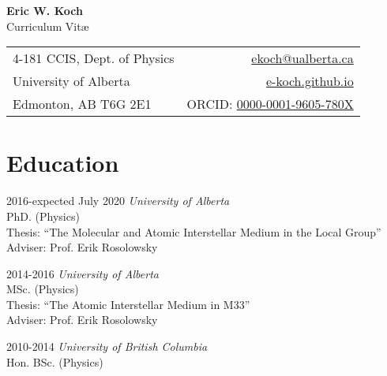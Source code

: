 \documentclass[letterpaper,11pt]{article}
\makeatletter
\newcommand{\myname}{Eric W. Koch}
\newcommand{\myaffil}{4-181 CCIS, Dept. of Physics}
\newcommand{\myemail}{ekoch@ualberta.ca}
\newcommand{\mypostlineone}{University of Alberta}
\newcommand{\mypostlinetwo}{Edmonton, AB T6G 2E1}
\newcommand{\mysite}{e-koch.github.io}
\newcommand{\myorcid}{https://orcid.org/0000-0001-9605-780X}
\newlength{\mainindent} \setlength{\mainindent}{12pt}
\newlength{\contentindent} \setlength{\contentindent}{19ex}
\newenvironment{datelist}{
  \begingroup
  \raggedright
  \begin{description}[labelindent=\mainindent,leftmargin=\contentindent,
      style=sameline,font=\normalfont,topsep=0pt,partopsep=0pt,parsep=0pt,
      itemsep=4pt]
}{
  \end{description}
  \endgroup
}
\makeatother
\begin{document}
\pagestyle{fancy}
\lhead{} \chead{} \rhead{} \renewcommand{\headrule}{\relax}
\cfoot{\thepage/\pageref*{LastPage}}
\rfoot{\textsc{\myname}}

\begin{center}
\textbf{\Large \myname} \\
{\large Curriculum Vit\ae}
\end{center}

\medskip

\begin{tabular*}{\textwidth}{@{\extracolsep{\fill}}lr}
\myaffil &
 \textsf{\href{mailto:\myemail}{\myemail}} \\
\mypostlineone &
 \url{\mysite} \\
\mypostlinetwo &
  \textsf{ORCID: \href{\myorcid}{0000-0001-9605-780X}} \\
\end{tabular*}

\medskip



\section*{Education}
\begin{datelist}
\item[2016-expected July 2020]
  \emph{University of Alberta} \\
  PhD. (Physics) \\
  Thesis: {``The Molecular and Atomic Interstellar Medium in the Local Group''} \\
  Adviser: Prof. Erik Rosolowsky
\item[2014-2016]
  \emph{University of Alberta} \\
  MSc. (Physics) \\
  Thesis: {``The Atomic Interstellar Medium in M33''} \\
  Adviser: Prof. Erik Rosolowsky
\item[2010-2014]
  \emph{University of British Columbia} \\
  Hon. BSc. (Physics)
\end{datelist}
\end{document}
